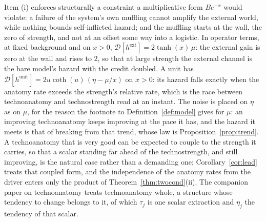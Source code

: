 \begin{remark}
\label{rem:gains}
Item (i) enforces structurally a constraint a multiplicative form
$Be^{-x}$ would violate: a failure of the system's own muffling cannot
amplify the external world, while nothing bounds self-inflicted hazard;
and the muffling starts at the wall, the zero of strength, and not at an
offset some way into a logistic. In operator terms, at fixed background
and on $x>0$, $\mathcal D[h^{\mathrm{ext}}]=2\tanh(x)\,\mu$: the external
gain is zero at the wall and rises to $2$, so that at large strength the
external channel is the bare model's hazard with the credit doubled. A
unit has $\mathcal D[h^{\mathrm{unit}}]=2u\coth(u)\,(\eta-\mu/x)$ on
$x>0$: its hazard falls exactly when the anatomy rate exceeds the
strength's relative rate, which is the race between technoanatomy and
technostrength read at an instant. The noise is placed on $\eta$ as on
$\mu$, for the reason the footnote to Definition~\ref{def:model} gives for
$\mu$: an improving technoanatomy keeps improving at the pace it has, and
the hazard it meets is that of breaking from that trend, whose law is Proposition~\ref{prop:trend}. A technoanatomy
that is very good can be expected to couple to the strength it carries,
so that a scalar standing far ahead of the technostrength, and still
improving, is the natural case rather than a demanding one;
Corollary~\ref{cor:lead} treats that coupled form, and the independence
of the anatomy rates from the driver enters only the product of
Theorem~\ref{thm:twocond}(ii). The companion paper on technoanatomy
treats technoanatomy whole, a structure whose tendency to change belongs
to it, of which $\tau_j$ is one scalar extraction and $\eta_j$ the
tendency of that scalar.
\end{remark}
